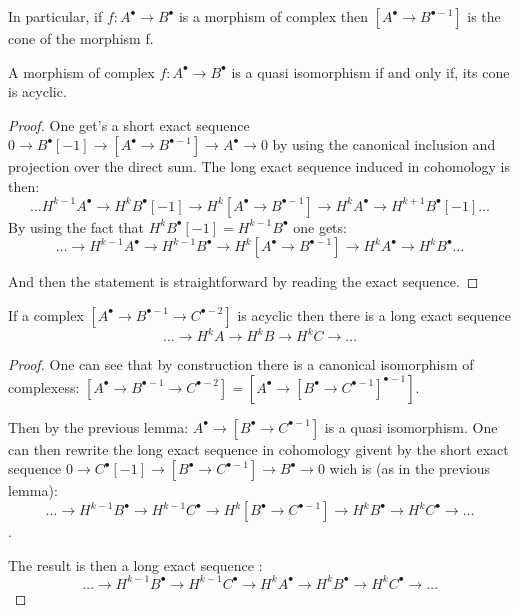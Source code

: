 \begin{remark}
    In particular, if $f:A^{\bullet}\to B^{\bullet}$ is a morphism of complex then $[A^{\bullet}\to B^{\bullet-1}]$ is the cone of the morphism f.
\end{remark}

\begin{lemma}\label{lem:q-iso_iff_cone_acyclic}
    A morphism of complex $f:A^{\bullet}\to B^{\bullet}$ is a quasi isomorphism if and only if, its cone is acyclic.
\end{lemma}

\begin{proof}
    One get's a short exact sequence $0\to B^{\bullet}[-1]\to [A^{\bullet}\to B^{\bullet-1}]\to A^{\bullet} \to 0$
    by using the canonical inclusion and projection over the direct sum. The long exact sequence induced in cohomology is then: \[\ldots H^{k-1}A^{\bullet} \to H^k B^{\bullet}[-1]\to H^k[A^{\bullet}\to B^{\bullet-1}]\to H^k A^{\bullet}\to H^{k+1}B^{\bullet}[-1]\ldots\]
    By using the fact that $H^k B^{\bullet}[-1]=H^{k-1}B^{\bullet}$ one gets:  \[\ldots\to  H^{k-1} A^{\bullet} \to H^{k-1} B^{\bullet}\to H^k[A^{\bullet}\to B^{\bullet-1}]\to H^k A^{\bullet}\to H^kB^{\bullet}\ldots\]

    And then the statement is straightforward by reading the exact sequence.
\end{proof}

\begin{lemma}\label{lem:complex_total_of_three_is_acyclic}
    If a complex $[A^{\bullet}\to B^{\bullet-1}\to C^{\bullet-2}]$ is acyclic then there is a long exact sequence \[\ldots \to H^k A\to H^k B\to H^k C\to \ldots\]
\end{lemma}

\begin{proof}
    One can see that by construction there is a canonical isomorphism of complexess: $[A^{\bullet}\to B^{\bullet-1}\to C^{\bullet-2}]=[A^{\bullet}\to [B^{\bullet}\to C^{\bullet-1}]^{\bullet-1}]$.

    Then by the previous lemma: $A^{\bullet}\to [B^{\bullet}\to C^{\bullet-1}]$ is a quasi isomorphism. One can then rewrite the long exact sequence in cohomology givent by the short exact sequence $0\to C^{\bullet}[-1]\to [B^{\bullet}\to C^{\bullet-1}]\to B^{\bullet} \to 0$ wich is (as in the previous lemma): \[\ldots\to  H^{k-1} B^{\bullet} \to H^{k-1} C^{\bullet}\to H^k[B^{\bullet}\to C^{\bullet-1}]\to H^k B^{\bullet}\to H^kC^{\bullet}\to \ldots\]. 

    The result is then a long exact sequence : \[\ldots\to  H^{k-1} B^{\bullet} \to H^{k-1} C^{\bullet}\to H^kA^{\bullet}\to H^k B^{\bullet}\to H^k C^{\bullet}\to\ldots\]

\end{proof}